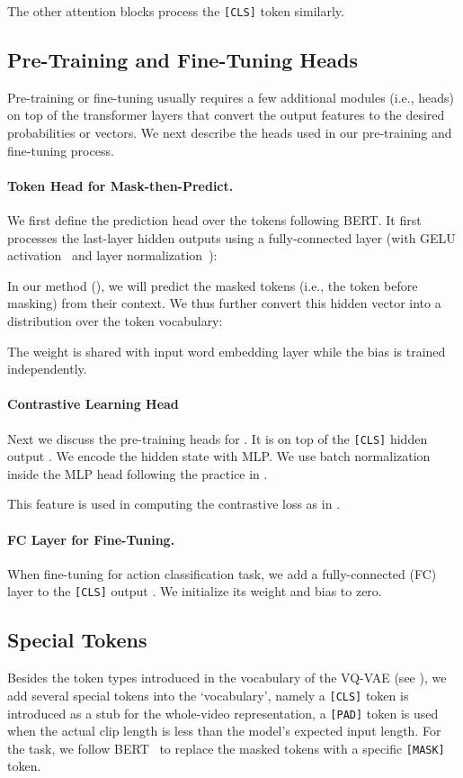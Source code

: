 The other attention blocks process the \texttt{[CLS]} token similarly. 


\subsection{Pre-Training and Fine-Tuning Heads}
\label{sec:appen_heads}
Pre-training or fine-tuning usually requires a few additional modules (i.e., heads) on top of the transformer layers that convert the output features to the desired probabilities or vectors.
We next describe the heads used in our pre-training and fine-tuning process.
\paragraph{Token Head for Mask-then-Predict.} 
We first define the prediction head over the tokens following BERT\cite{devlin2019bert}. 
It first processes the last-layer hidden outputs  using a fully-connected layer (with GELU activation~\cite{hendrycks2016gaussian} and layer normalization~\cite{ba2016layer}):

In our \ourmask method (), we will predict the masked tokens (i.e., the token before masking) from their context. 
We thus further convert this hidden vector into a distribution over the token vocabulary:

The weight  is shared with input word embedding layer  \cite{press2017using, devlin2019bert} while the bias  is trained independently.

\paragraph{Contrastive Learning Head}
Next we discuss the pre-training heads for \ourcl. It is on top of the \texttt{[CLS]} hidden output .  We encode the hidden state with MLP.
We use batch normalization \cite{ioffe2015batch} inside the MLP head following the practice in \cite{chen2021mocov3}.

This  feature is used in computing the contrastive loss as in .

\paragraph{FC Layer for Fine-Tuning.}
When fine-tuning for action classification task, we add a fully-connected (FC) layer to the \texttt{[CLS]} output .
We initialize its weight and bias to zero.

\subsection{Special Tokens} 
Besides the  token types introduced in the vocabulary of the VQ-VAE (see ), we add several special tokens into the `vocabulary', namely a \texttt{[CLS]} token is introduced as a stub for the whole-video representation, 
a \texttt{[PAD]} token is used when the actual clip length is less than the model's expected input length. For the \ourmask task, we follow BERT~\cite{devlin2019bert} to replace the masked tokens with a specific \texttt{[MASK]} token.



